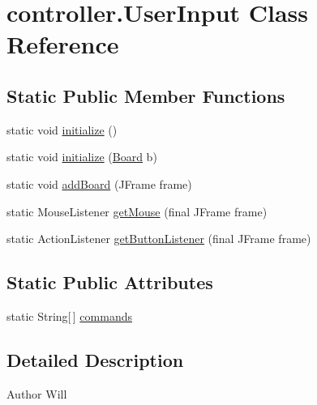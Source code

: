 \hypertarget{classcontroller_1_1_user_input}{\section{controller.\-User\-Input Class Reference}
\label{classcontroller_1_1_user_input}
}
\subsection*{Static Public Member Functions}
\begin{DoxyCompactItemize}
\item 
static void \hyperlink{classcontroller_1_1_user_input_a37875bb372fb553dd8c0b00c446cd8c8}{initialize} ()
\item 
static void \hyperlink{classcontroller_1_1_user_input_a2edf82c008ecb8e16fc5677ae2245096}{initialize} (\hyperlink{classmodel_1_1_board}{Board} b)
\item 
static void \hyperlink{classcontroller_1_1_user_input_a8f95926a6a2584e7ec49c005003a20f7}{add\-Board} (J\-Frame frame)
\item 
static Mouse\-Listener \hyperlink{classcontroller_1_1_user_input_a0d697f5a1fee3566c41b1757485aaa94}{get\-Mouse} (final J\-Frame frame)
\item 
static Action\-Listener \hyperlink{classcontroller_1_1_user_input_a0d07f20118bcbfbef924603e367573d3}{get\-Button\-Listener} (final J\-Frame frame)
\end{DoxyCompactItemize}
\subsection*{Static Public Attributes}
\begin{DoxyCompactItemize}
\item 
static String\mbox{[}$\,$\mbox{]} \hyperlink{classcontroller_1_1_user_input_ad5bc549a7fc015878009b793ea479871}{commands}
\end{DoxyCompactItemize}


\subsection{Detailed Description}
\begin{DoxyAuthor}{Author}
Will 
\end{DoxyAuthor}



